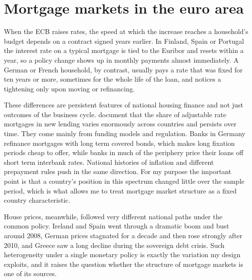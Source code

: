\section{Mortgage markets in the euro area}
\label{sec:background}

When the ECB raises rates, the speed at which the increase reaches a
household's budget depends on a contract signed years earlier. In Finland,
Spain or Portugal the interest rate on a typical mortgage is tied to the
Euribor and resets within a year, so a policy change shows up in monthly
payments almost immediately. A German or French household, by contrast,
usually pays a rate that was fixed for ten years or more, sometimes for the
whole life of the loan, and notices a tightening only upon moving or
refinancing.

These differences are persistent features of national housing finance and
not just outcomes of the business cycle. \citet{badarinza2018} document
that the share of adjustable rate mortgages in new lending varies
enormously across countries and persists over time. They come mainly from
funding models and regulation. Banks in Germany refinance mortgages with long term covered
bonds, which makes long fixation periods cheap to offer, while banks in
much of the periphery price their loans off short term interbank rates.
National histories of inflation and different prepayment rules push in the
same direction. For my purpose the important point is that a country's
position in this spectrum changed little over the sample period, which is
what allows me to treat mortgage market structure as a fixed country
characteristic.

House prices, meanwhile, followed very different national paths under the
common policy. Ireland and Spain went through a dramatic boom and bust
around 2008, German prices stagnated for a decade and then rose strongly
after 2010, and Greece saw a long decline during the sovereign debt
crisis. Such heterogeneity under a single monetary policy is exactly the
variation my design exploits, and it raises the question whether the
structure of mortgage markets is one of its sources.
